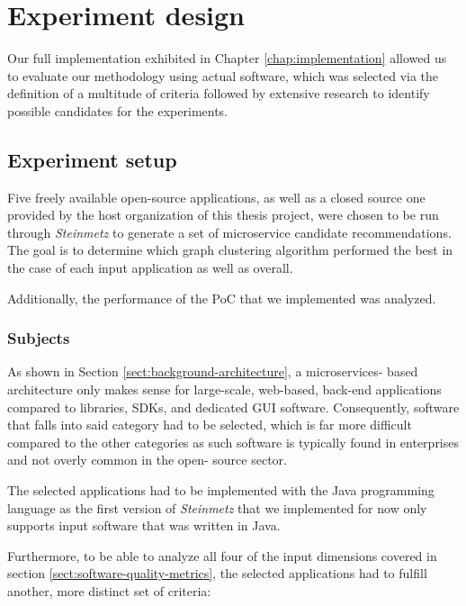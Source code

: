 \documentclass[12pt,a4paper]{report}
\begin{document}
\chapter{Experiment design} \label{chap:experiment-design}

Our full implementation exhibited in Chapter \ref{chap:implementation} allowed
us to evaluate our methodology using actual software, which was selected via
the definition of a multitude of criteria followed by extensive research to
identify possible candidates for the experiments.



\section{Experiment setup}

Five freely available open-source applications, as well as a closed source one
provided by the host organization of this thesis project, were chosen to be run
through \textit{Steinmetz} to generate a set of microservice candidate
recommendations. The goal is to determine which graph clustering algorithm
performed the best in the case of each input application as well as overall.

Additionally, the performance of the PoC that we implemented was analyzed.


\subsection{Subjects}

As shown in Section \ref{sect:background-architecture}, a microservices\hyp
based architecture only makes sense for large\hyp scale, web\hyp based,
back\hyp end applications compared to libraries, SDKs, and dedicated GUI
software. Consequently, software that falls into said category had to be
selected, which is far more difficult compared to the other categories as such
software is typically found in enterprises and not overly common in the open\hyp
source sector.

The selected applications had to be implemented with the Java
programming language as the first version of \textit{Steinmetz} that we
implemented for now only supports input software that was written in Java.

Furthermore, to be able to analyze all four of the input dimensions covered in
section \ref{sect:software-quality-metrics}, the selected applications had to
fulfill another, more distinct set of criteria:
\end{document}
